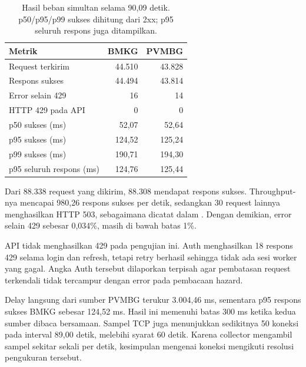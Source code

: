 \begin{table}[htbp]
\centering\small
\begin{tabular}{lrr}
\toprule
Metrik & BMKG & PVMBG \\
\midrule
Request terkirim & 44.510 & 43.828 \\
Respons sukses & 44.494 & 43.814 \\
Error selain 429 & 16 & 14 \\
HTTP 429 pada API & 0 & 0 \\
p50 sukses (ms) & 52,07 & 52,64 \\
p95 sukses (ms) & 124,52 & 125,24 \\
p99 sukses (ms) & 190,71 & 194,30 \\
p95 seluruh respons (ms) & 124,76 & 125,44 \\
\bottomrule
\end{tabular}
\caption{Hasil beban simultan selama 90,09 detik. p50/p95/p99 sukses dihitung dari 2xx; p95 seluruh respons juga ditampilkan.}
\label{tab:load}
\end{table}
Dari 88.338 request yang dikirim, 88.308 mendapat respons sukses. Throughput-nya mencapai 980,26 respons sukses per detik, sedangkan 30 request lainnya menghasilkan HTTP 503, sebagaimana dicatat dalam . Dengan demikian, error selain 429 sebesar 0,034\%, masih di bawah batas 1\%.

API tidak menghasilkan 429 pada pengujian ini. Auth menghasilkan 18 respons 429 selama login dan refresh, tetapi retry berhasil sehingga tidak ada sesi worker yang gagal. Angka Auth tersebut dilaporkan terpisah agar pembatasan request terkendali tidak tercampur dengan error pada pembacaan hazard.

Delay langsung dari sumber PVMBG terukur 3.004,46 ms, sementara p95 respons sukses BMKG sebesar 124,52 ms. Hasil ini memenuhi batas 300 ms ketika kedua sumber dibaca bersamaan. Sampel TCP juga menunjukkan sedikitnya 50 koneksi pada interval 89,00 detik, melebihi syarat 60 detik. Karena collector mengambil sampel sekitar sekali per detik, kesimpulan mengenai koneksi mengikuti resolusi pengukuran tersebut.

